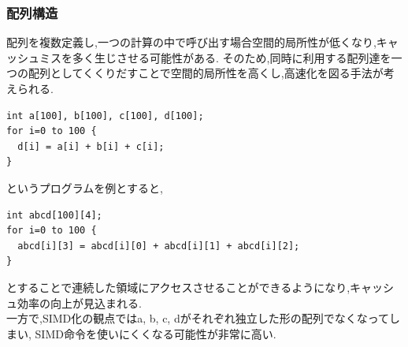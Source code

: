 \subsubsection{配列構造}
配列を複数定義し,一つの計算の中で呼び出す場合空間的局所性が低くなり,キャッシュミスを多く生じさせる可能性がある.
そのため,同時に利用する配列達を一つの配列としてくくりだすことで空間的局所性を高くし,高速化を図る手法が考えられる.\\
{\footnotesize
\begin{lstlisting}[numbers=none]
int a[100], b[100], c[100], d[100];
for i=0 to 100 {
  d[i] = a[i] + b[i] + c[i];
}
\end{lstlisting}
}
というプログラムを例とすると,
{\footnotesize
\begin{lstlisting}[numbers=none]
int abcd[100][4];
for i=0 to 100 {
  abcd[i][3] = abcd[i][0] + abcd[i][1] + abcd[i][2];
}
\end{lstlisting}
}
とすることで連続した領域にアクセスさせることができるようになり,キャッシュ効率の向上が見込まれる.\\
一方で,SIMD化の観点ではa, b, c, dがそれぞれ独立した形の配列でなくなってしまい,
SIMD命令を使いにくくなる可能性が非常に高い.\\

